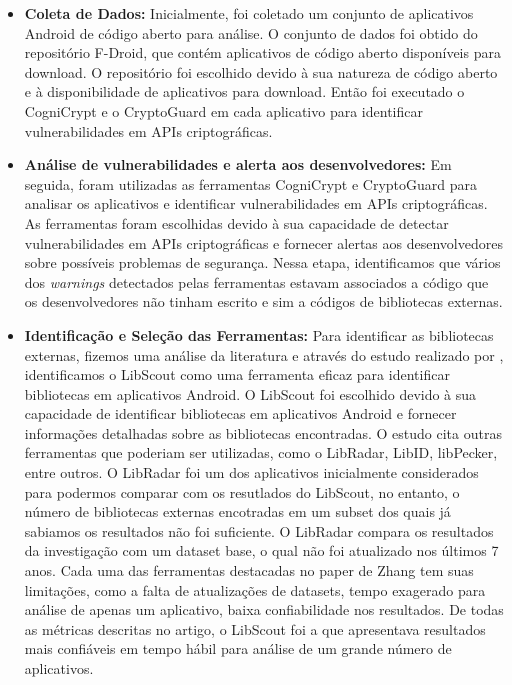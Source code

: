 \begin{itemize}
\item \textbf{Coleta de Dados:} Inicialmente, foi coletado um conjunto de aplicativos Android de código aberto para análise. O conjunto de dados foi obtido do repositório F-Droid, que contém aplicativos de código aberto disponíveis para download. O repositório foi escolhido devido à sua natureza de código aberto e à disponibilidade de aplicativos para download. Então foi executado o CogniCrypt e o CryptoGuard em cada aplicativo para identificar vulnerabilidades em APIs criptográficas.

\item \textbf{Análise de vulnerabilidades e alerta aos desenvolvedores:} Em seguida, foram utilizadas as ferramentas CogniCrypt e CryptoGuard para analisar os aplicativos e identificar vulnerabilidades em APIs criptográficas. As ferramentas foram escolhidas devido à sua capacidade de detectar vulnerabilidades em APIs criptográficas e fornecer alertas aos desenvolvedores sobre possíveis problemas de segurança. Nessa etapa, identificamos que vários dos \textit{warnings} detectados pelas ferramentas estavam associados a código que os desenvolvedores não tinham escrito e sim a códigos de bibliotecas externas. 

\item \textbf{Identificação e Seleção das Ferramentas:} Para identificar as bibliotecas externas, fizemos uma análise da literatura e através do estudo realizado por \cite{api_tpl_zhang}, identificamos o LibScout como uma ferramenta eficaz para identificar bibliotecas em aplicativos Android. O LibScout foi escolhido devido à sua capacidade de identificar bibliotecas em aplicativos Android e fornecer informações detalhadas sobre as bibliotecas encontradas. O estudo cita outras ferramentas que poderiam ser utilizadas, como o LibRadar, LibID, libPecker, entre outros. O LibRadar foi um dos aplicativos inicialmente considerados para podermos comparar com os resutlados do LibScout, no entanto, o número de bibliotecas externas encotradas em um subset dos quais já sabiamos os resultados não foi suficiente. O LibRadar compara os resultados da investigação com um dataset base, o qual não foi atualizado nos últimos 7 anos. Cada uma das ferramentas destacadas no paper de Zhang tem suas limitações, como a falta de atualizações de datasets, tempo exagerado para análise de apenas um aplicativo, baixa confiabilidade nos resultados. De todas as métricas descritas no artigo, o LibScout foi a que apresentava resultados mais confiáveis em tempo hábil para análise de um grande número de aplicativos. 


\end{itemize}
